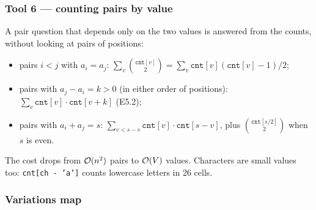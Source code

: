 \subsubsection*{Tool 6 --- counting pairs by value}

A pair question that depends only on the two values is answered from the counts, without looking at pairs of positions:
\begin{itemize}[leftmargin=*]
    \item pairs $i < j$ with $a_i = a_j$: $\sum_v \binom{\texttt{cnt}[v]}{2} = \sum_v \texttt{cnt}[v](\texttt{cnt}[v]-1)/2$;
    \item pairs with $a_j - a_i = k > 0$ (in either order of positions): $\sum_v \texttt{cnt}[v]\cdot\texttt{cnt}[v+k]$ (E5.2);
    \item pairs with $a_i + a_j = s$: $\sum_{v < s - v} \texttt{cnt}[v]\cdot\texttt{cnt}[s-v]$, plus $\binom{\texttt{cnt}[s/2]}{2}$ when $s$ is even.
\end{itemize}
The cost drops from $\mathcal{O}(n^2)$ pairs to $\mathcal{O}(V)$ values. Characters are small values too: \texttt{cnt[ch - 'a']} counts lowercase letters in 26 cells.

\begin{diagrambox}
\end{diagrambox}

\subsubsection*{Variations map}

